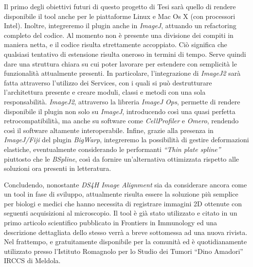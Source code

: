 \noindent Il primo degli obiettivi futuri di questo progetto di Tesi sarà quello di rendere disponibile il tool anche per le piattaforme Linux e Mac Os X (con processori Intel). Inoltre, integreremo il plugin anche in \textit{ImageJ}, attuando un refactoring completo del codice. Al momento non è presente una divisione dei compiti in maniera netta, e il codice risulta strettamente accoppiato. Ciò significa che qualsiasi tentativo di estensione risulta oneroso in termini di tempo. Serve quindi dare una struttura chiara su cui poter lavorare per estendere con semplicità le funzionalità attualmente presenti. In particolare, l'integrazione di \textit{ImageJ2} sarà fatta attraverso l’utilizzo dei Services, con i quali si può destrutturare l'architettura presente e creare moduli, classi e metodi con una sola responsabilità. \textit{ImageJ2}, attraverso la libreria \textit{ImageJ Ops}, permette di rendere disponibile il plugin non solo su \textit{ImageJ}, introducendo così una quasi perfetta retrocompatibilità, ma anche su software come \textit{CellProfiler} e \textit{Omero}, rendendo così il software altamente interoperabile. Infine, grazie alla presenza in \textit{ImageJ/Fiji} del plugin \textit{BigWarp}, integreremo la possibilità di gestire deformazioni elastiche, eventualmente considerando le performanti \textit{``Thin plate spline''} piuttosto che le \textit{BSpline}, così da fornire un'alternativa ottimizzata rispetto alle soluzioni ora presenti in letteratura.\hfill\break

\noindent Concludendo, nonostante \textit{DS4H Image Alignment} sia da considerare ancora come un tool in fase di sviluppo, attualmente risulta essere la soluzione più semplice per biologi e medici che hanno necessita di registrare immagini 2D ottenute con seguenti acquisizioni al microscopio. Il tool è già stato utilizzato e citato in un primo articolo scientifico pubblicato in Frontiers in Immunology ed una descrizione dettagliata dello stesso verrà a breve sottomessa ad una nuova rivista. Nel frattempo, e gratuitamente disponibile per la comunità ed è quotidianamente utilizzato presso l’Istituto Romagnolo per lo Studio dei Tumori ``Dino Amadori'' IRCCS di Meldola.